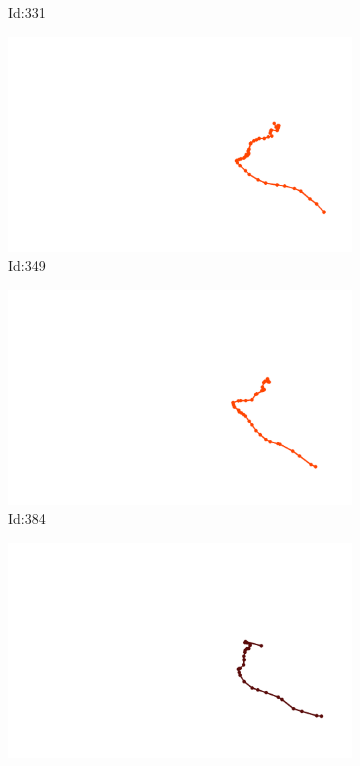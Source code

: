 \documentclass[12pt,twoside]{report}
\begin{document}
\begin{figure}
\begin{subfigure}[b]{0.20\textwidth}
\caption{Id:331}
\end{subfigure}
\begin{subfigure}[b]{0.20\textwidth}
\centering
\includegraphics[width=\textwidth]{../trajectories/349.png}
\caption{Id:349}
\end{subfigure}
\begin{subfigure}[b]{0.20\textwidth}
\centering
\includegraphics[width=\textwidth]{../trajectories/384.png}
\caption{Id:384}
\end{subfigure}
\begin{subfigure}[b]{0.20\textwidth}
\centering
\includegraphics[width=\textwidth]{../trajectories/425.png}

\end{subfigure}
\end{figure}
\end{document}

